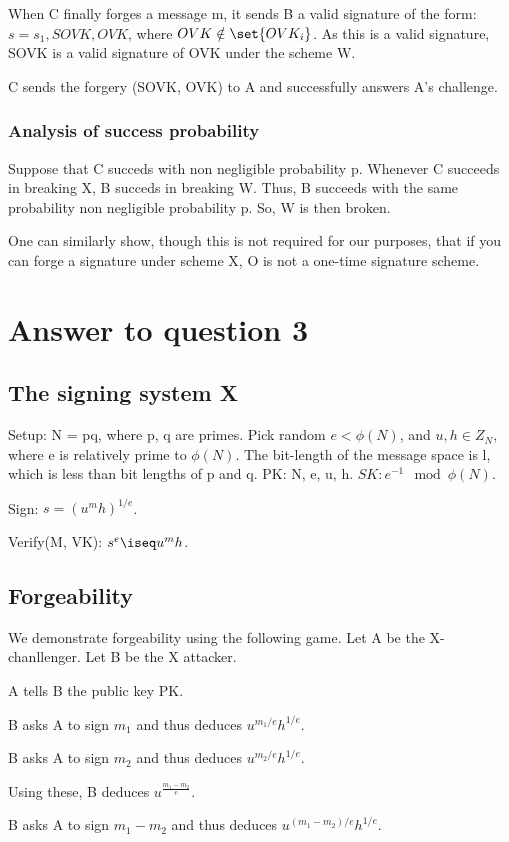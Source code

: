 \documentclass[10pt]{amsart}
\begin{document}
When C finally forges a message m, it sends B a valid signature of the form: $s = s_1, SOVK, OVK$, where $OVK \notin \set{OVK_{i}}$. As this is a valid signature, SOVK is a valid signature of OVK under the scheme W.

C sends the forgery (SOVK, OVK) to A and successfully answers A's challenge.

\subsubsection{Analysis of success probability}
Suppose that C succeds with non negligible probability p. Whenever C succeeds in breaking X, B succeds in breaking W. Thus, B succeeds with the same probability non negligible probability p. So, W is then broken.

One can similarly show, though this is not required for our purposes, that if you can forge a signature under scheme X, O is not a one-time signature scheme.

\section{Answer to question 3}
\subsection{The signing system X}
Setup: N = pq, where p, q are primes. Pick random $e<\phi(N)$,  and $u, h \in Z_{N}$, where e is relatively prime to $\phi(N)$. The bit-length of the message space is l, which is less than bit lengths of p and q. PK: N, e, u, h. $SK: e^{-1} \mod \phi(N)$.

Sign: $s = (u^{m}h)^{1/e}$.

Verify(M, VK): $s^{e} \iseq u^{m}h$.

\subsection{Forgeability}
We demonstrate forgeability using the following game. Let A be the X-chanllenger. Let B be the X attacker.

A tells B the public key PK.

B asks A to sign $m_{1}$ and thus deduces $u^{m_{1}/e}h^{1/e}$.

B asks A to sign $m_{2}$ and thus deduces $u^{m_{2}/e}h^{1/e}$.

Using these, B deduces $u^{\frac{m_{1}-m_{2}}{e}}$.

B asks A to sign $m_{1}-m_{2}$ and thus deduces $u^{(m_{1}-m_{2})/e}h^{1/e}$.
\end{document}
